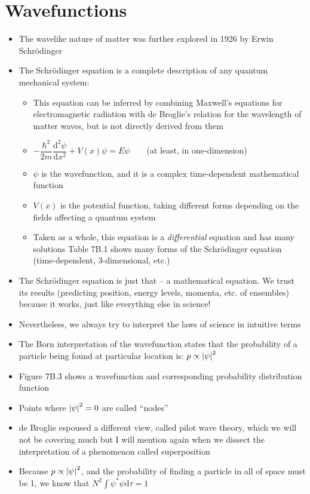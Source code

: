 \documentclass[12pt, openany, letterpaper]{memoir}
\begin{document}
\section{Wavefunctions}
\begin{itemize}
	\item The wavelike nature of matter was further explored in 1926 by Erwin Schr\"odinger
	\item The Schr\"odinger equation is a complete description of any quantum mechanical system:
	\begin{itemize}
		\item This equation can be inferred by combining Maxwell's equations for electromagnetic radiation with de Broglie's relation for the wavelength of matter waves, but is not directly derived from them
		\item $-\dfrac{\hbar^2}{2m}\dfrac{\mathrm{d}^2\psi}{\mathrm{d}x^2} + V(x)\psi=E\psi$ ~ ~ (at least, in one-dimension)
		\item $\psi$ is the wavefunction, and it is a complex time-dependent mathematical function
		\item $V(x)$ is the potential function, taking different forms depending on the fields affecting a quantum system
		\item Taken as a whole, this equation is a \emph{differential} equation and has many solutions
		Table 7B.1 shows many forms of the Schr\"odinger equation (time-dependent, 3-dimensional, etc.)
	\end{itemize}
	\item The Schr\"odinger equation is just that -- a mathematical equation. We trust its results (predicting position, energy levels, momenta, etc. of ensembles) because it works, just like everything else in science!
	\item Nevertheless, we always try to interpret the laws of science in intuitive terms
	\item The Born interpretation of the wavefunction states that the probability of a particle being found at particular location is: $p\propto\left| \psi \right|^2$
	\item Figure 7B.3 shows a wavefunction and corresponding probability distribution function
	\item Points where $\left| \psi \right|^2=0$ are called “nodes”
	\item de Broglie espoused a different view, called pilot wave theory, which we will not be covering much but I will mention again when we dissect the interpretation of a phenomenon called superposition
	\item Because $p\propto\left| \psi \right|^2$, and the probability of finding a particle in all of space must be 1, we know that $N^2\displaystyle\int\psi^*\psi\mathrm{d}\tau=1$	

\end{itemize}
\end{document}
